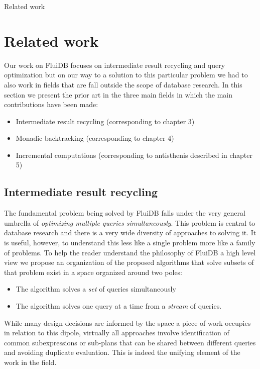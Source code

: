 \begin{corrected}{Related work}
\section{Related work}

Our work on FluiDB focuses on intermediate result recycling and query
optimization but on our way to a solution to this particular problem
we had to also work in fields that are fall outside the scope of
database research. In this section we present the prior art in the
three main fields in which the main contributions have been made:

\begin{itemize}
\item Intermediate result recycling (corresponding to chapter 3)
\item Monadic backtracking (corresponding to chapter 4)
\item Incremental computations (corresponding to antisthenis described in
chapter 5)
\end{itemize}

\subsection{Intermediate result recycling}

The fundamental problem being solved by FluiDB falls under the very
general umbrella of \emph{optimizing multiple queries simultaneously}. This
problem is central to database research and there is a very wide
diversity of approaches to solving it. It is useful, however, to
understand this less like a single problem more like a family of
problems. To help the reader understand the philosophy of FluiDB a
high level view we propose an organization of the proposed algorithms
that solve subsets of that problem exist in a space organized around
two poles:

\begin{itemize}
\item The algorithm solves a \emph{set} of queries simultaneously
\item The algorithm solves one query at a time from a \emph{stream} of queries.
\end{itemize}

While many design decisions are informed by the space a piece of work
occupies in relation to this dipole, virtually all approaches involve
identification of common subexpressions or sub-plans that can be
shared between different queries and avoiding duplicate
evaluation. This is indeed the unifying element of the work in the
field.


\end{corrected}
